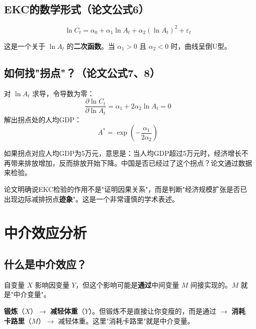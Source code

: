 \documentclass[12pt, a4paper]{article}
\begin{document}
\subsection{EKC的数学形式（论文公式6）}

\[
\ln C_t = \alpha_0 + \alpha_1 \ln A_t + \alpha_2 (\ln A_t)^2 + \varepsilon_t
\]

这是一个关于 $\ln A_t$ 的\textbf{二次函数}。当 $\alpha_1 > 0$ 且 $\alpha_2 < 0$ 时，曲线呈倒U型。

\subsection{如何找"拐点"？（论文公式7、8）}

对 $\ln A_t$ 求导，令导数为零：
\[
\frac{\partial \ln C_t}{\partial \ln A_t} = \alpha_1 + 2\alpha_2 \ln A_t = 0
\]
解出拐点处的人均GDP：
\[
A^* = \exp\left(-\frac{\alpha_1}{2\alpha_2}\right)
\]

\begin{examplebox}[拐点的含义]
如果拐点对应人均GDP为5万元，意思是：当人均GDP超过5万元时，经济增长不再带来排放增加，反而排放开始下降。中国是否已经过了这个拐点？论文通过数据来检验。
\end{examplebox}

\begin{tipbox}[论文的定位]
论文明确说EKC检验的作用不是"证明因果关系"，而是判断"经济规模扩张是否已出现边际减排拐点\textbf{迹象}"。这是一个非常谨慎的学术表述。
\end{tipbox}

\section{中介效应分析}

\subsection{什么是中介效应？}

\begin{conceptbox}[中介效应]
自变量 $X$ 影响因变量 $Y$，但这个影响可能是\textbf{通过}中间变量 $M$ 间接实现的。$M$ 就是"中介变量"。
\end{conceptbox}

\begin{examplebox}[生活例子]
\textbf{锻炼}（$X$）$\to$ \textbf{减轻体重}（$Y$）。但锻炼不是直接让你变瘦的，而是通过 $\to$ \textbf{消耗卡路里}（$M$）$\to$ 减轻体重。这里"消耗卡路里"就是中介变量。
\end{examplebox}
\end{document}
